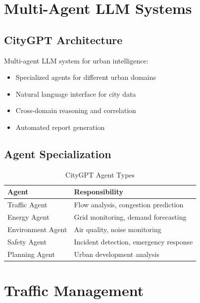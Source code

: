 \documentclass[12pt,a4paper]{article}
\begin{document}
\section{Multi-Agent LLM Systems}

\subsection{CityGPT Architecture}

Multi-agent LLM system for urban intelligence:
\begin{itemize}
    \item Specialized agents for different urban domains
    \item Natural language interface for city data
    \item Cross-domain reasoning and correlation
    \item Automated report generation
\end{itemize}

\subsection{Agent Specialization}

\begin{table}[H]
\centering
\caption{CityGPT Agent Types}
\begin{tabular}{ll}
\toprule
\textbf{Agent} & \textbf{Responsibility} \\
\midrule
Traffic Agent & Flow analysis, congestion prediction \\
Energy Agent & Grid monitoring, demand forecasting \\
Environment Agent & Air quality, noise monitoring \\
Safety Agent & Incident detection, emergency response \\
Planning Agent & Urban development analysis \\
\bottomrule
\end{tabular}
\end{table}

\section{Traffic Management}
\end{document}
